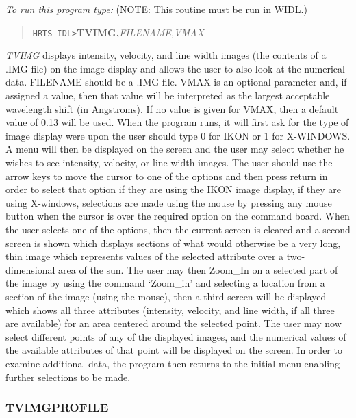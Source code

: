 {\em To run this program type:} (NOTE: This routine must be run in WIDL.)
\begin{quote}
{\tt HRTS\_IDL>}{\bf TVIMG,}{\it FILENAME,VMAX}
\end{quote}
{\em TVIMG} displays intensity, velocity, and line width images (the
   contents of a .IMG file) on the image display and allows the user to also
look at
   the numerical data.  FILENAME should be a .IMG file. VMAX is an optional
parameter
   and, if assigned a value, then that value will be interpreted as the
   largest acceptable wavelength shift (in Angstroms).  If no value is
   given for VMAX, then a default value of 0.13 will be used.  When the
   program runs, it will first ask for the type of image display
   were upon the user should type 0 for IKON or 1 for X-WINDOWS.
   A menu will then be displayed on the screen and
   the user may select whether he wishes to see intensity, velocity, or
   line width images.  The user should use the arrow keys to move the
   cursor to one of the options and then press return in
   order to select that option if they are using the IKON image
   display, if they are using X-windows, selections are made using the mouse by
   pressing any mouse button when the cursor is over the required
   option on the command board.
   When the user selects one of the options, then the
   current screen is cleared and a second screen is shown which displays
   sections of what would otherwise be a very long, thin image which
   represents values of the selected attribute over a two-dimensional area
   of the sun. The user may then Zoom\_In on a selected part of the
   image by using the command `Zoom\_in' and selecting a location from a section
of the image
   (using the mouse), then a third screen will be displayed which shows all
three attributes
   (intensity, velocity, and line width, if all three are available) for
   an area centered around the selected point.  The user may now select
   different points of any of the displayed images, and the numerical
   values of the available attributes of that point will be displayed on
   the screen.  In order to examine additional data, the program then returns
   to the initial menu enabling further selections to be made.

\subsubsection{TVIMGPROFILE}

